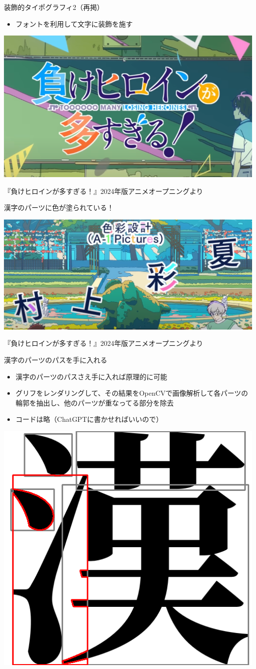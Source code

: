 \documentclass[unicode,14pt]{beamer}
\begin{document}
\begin{frame}[t]{装飾的タイポグラフィ2（再掲）}
  \sffamily
  \begin{itemize}
\item フォントを利用して文字に装飾を施す
  \end{itemize}
  \begin{center}
    \includegraphics[width=.65\textwidth]{figures/makein.png}
  \end{center}
\raggedleft\tiny\color{50gray} 
『負けヒロインが多すぎる！』2024年版アニメオープニングより
\end{frame}

\begin{frame}[t]{漢字のパーツに色が塗られている！}
  \sffamily
  \begin{center}
    \includegraphics[width=.65\textwidth]{figures/makein2.png}
  \end{center}
\raggedleft\tiny\color{50gray} 
『負けヒロインが多すぎる！』2024年版アニメオープニングより 
\end{frame}

\begin{frame}[t]{漢字のパーツのパスを手に入れる}
  \sffamily
  \begin{itemize}
\item 漢字のパーツのパスさえ手に入れば原理的に可能
\item グリフをレンダリングして、その結果をOpenCVで画像解析して各パーツの輪郭を抽出し、他のパーツが重なってる部分を除去
\item コードは略（ChatGPTに書かせればいいので）
  \end{itemize}
  \begin{center}
    \includegraphics[width=.3\textwidth]{figures/segmented_glyph_with_polygon.png}
  \end{center}
\end{frame}
\end{document}
